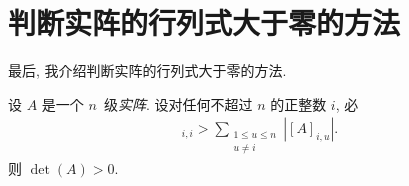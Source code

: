 \section{判断实阵的行列式大于零的方法}

最后, 我介绍判断实阵的行列式大于零的方法.

\begin{theorem}
    设 \(A\) 是一个 \(n\)~级\emph{实阵}.
    设对任何不超过 \(n\) 的正整数 \(i\), 必
    \begin{align*}
        [A]_{i,i} >
        \sum_{\substack{1 \leq u \leq n \\
            u \neq i}} {|[A]_{i,u}|}.
    \end{align*}
    则 \(\det {(A)} > 0\).
\end{theorem}





